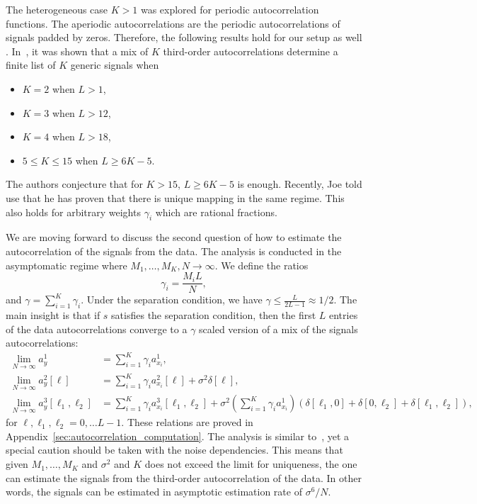 \documentclass[english]{article}
\newcommand{\TODO}[1]{{\color{red}{[#1]}}}
\numberwithin{equation}{section}
\theoremstyle{plain}
\theoremstyle{definition}
\theoremstyle{remark}
\theoremstyle{plain}
\theoremstyle{remark}
\theoremstyle{plain}
\theoremstyle{plain}
\begin{document}
The heterogeneous case $K>1$ was explored for periodic autocorrelation functions. The aperiodic autocorrelations are the periodic autocorrelations of signals padded by zeros. Therefore, the following results hold for our setup as well  \TODO{we should be prudent here to make sure that this set does not ``fall'' in the zero measure}. In~\cite{bandeira2017estimation}, it was shown that a mix of $K$ third-order autocorrelations determine  a finite list of $K$ generic signals when 
\begin{itemize}
	\item $K=2$ when $L>1$,
	\item $K=3$ when $L>12$,
	\item $K=4$ when $L>18$,
	\item $5\leq K\leq 15$ when $L\geq 6K-5$.	
\end{itemize}
The authors conjecture that for $K>15$, $L\geq 6K-5$ is enough. Recently, Joe told use that he has proven that there is unique mapping in the same regime.  
This also holds for arbitrary weights $\gamma_i$ which are rational fractions.

\TODO{Where we should refer to Gianakis's paper?}

We are moving forward to discuss the second question of how to estimate the autocorrelation of the signals from the data. 
The analysis is conducted in the asymptomatic regime where $M_1,\ldots,M_K,N\to\infty$. We define the ratios 
\begin{equation}
\gamma_i = \frac{M_i L}{N},
\end{equation}
and $\gamma = \sum_{i=1}^K\gamma_i$.
Under the separation condition, we have $\gamma\leq\frac{L}{2L-1}\approx 1/2$.
The main insight is that if $s$ satisfies the separation condition, then the first $L$ entries of the data autocorrelations converge to a $\gamma$ scaled version of a mix of the signals autocorrelations:
\begin{align}
\lim_{N\to\infty} a_y^1 &= \sum_{i=1}^K\gamma_i a_{x_i}^1, \\
\lim_{N\to\infty} a_y^2[\ell] &= \sum_{i=1}^K\gamma_i a_{x_i}^2[\ell] +\sigma^2\delta[\ell],\\
\lim_{N\to\infty} a_y^3[\ell_1,\ell_2] &= \sum_{i=1}^K\gamma_i a_{x_i}^3[\ell_1,\ell_2] + \sigma^2\left(\sum_{i=1}^K\gamma_i a_{x_i}^1\right)(\delta[\ell_1,0]+\delta[0,\ell_2]+\delta[\ell_1,\ell_2]),
\end{align}
for $\ell,\ell_1,\ell_2=0,\ldots L-1$.
These relations are proved in Appendix~\ref{sec:autocorrelation_computation}. The analysis is similar to~\cite{bendory2017bispectrum,boumal2017heterogeneous}, yet a special caution should be taken with the noise dependencies. This means that given $M_1,\ldots,M_K$ and $\sigma^2$ and $K$ does not exceed the limit for uniqueness, the one can estimate the signals from the third-order autocorrelation of the data. In other words, the signals can be estimated in asymptotic estimation rate of $\sigma^6/N$.
\end{document}
